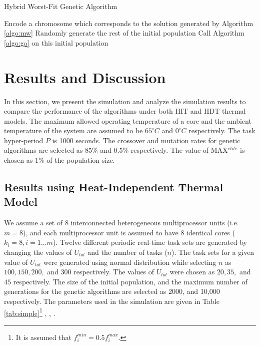 \documentclass[conference]{IEEEtran}
\begin{document}
\begin{algorithm}
\caption{Hybrid Worst-Fit Genetic Algorithm} \label{algo:hywga}
\footnotesize
\begin{algorithmic}[1]
\STATE Encode a chromosome which corresponds to the solution generated by Algorithm \ref{algo:mw}
\STATE Randomly generate the rest of the initial population
\STATE Call Algorithm \ref{algo:ga} on this initial population
\end{algorithmic}
\end{algorithm}
\vspace{-0.2in}


\section{Results and Discussion}

In this section, we present the simulation and analyze the simulation results
to compare the performance of the algorithms under both HIT and HDT thermal models.
The maximum allowed operating temperature of a core and the ambient temperature of the system are assumed to
be  $65^\circ C$ and $0^\circ C$ respectively. The task hyper-period $P$ is 1000 seconds.
The crossover and mutation rates for genetic algorithms are selected as 85\% and 0.5\% respectively. The value of
MAX$^{elite}$ is chosen as 1\% of the population size.

\subsection{Results using Heat-Independent  Thermal Model}

We assume a set of $8$ interconnected heterogeneous multiprocessor units (i.e. $m=8$), and each multiprocessor unit  is
assumed to have $8$ identical cores ($k_i=8, i=1 \ldots m$).
Twelve different periodic real-time task sets are generated by changing the values of $U_{tot}$ and the number of tasks ($n$).
The task sets for a given value of $U_{tot}$ were generated using normal distribution while selecting $n$ as $100, 150, 200,$ and $300$ respectively.
The values of $U_{tot}$ were chosen as  $20, 35,$ and $45$ respectively.
The size of the initial population, and the maximum number of generations for the genetic algorithms are selected as 2000, and 10,000 respectively.
The parameters used in the simulation are  given in Table \ref{tab:simple}\footnote{It is assumed that $f_i^{min} = 0.5f_i^{max}$.} \cite{Quan10}, \cite{Leping10}, \cite{Chaturvedi10}.
\end{document}
